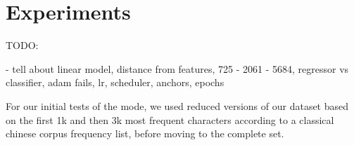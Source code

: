 \section{Experiments}
\label{sec:experiments}

TODO:

- tell about linear model, distance from features,  725 - 2061 - 5684, regressor vs classifier, adam fails, lr, scheduler, anchors, epochs



For our initial tests of the mode, we used reduced versions of our dataset based on the first 1k and then 3k most frequent characters according to a classical chinese corpus frequency list, before moving to the complete set.


